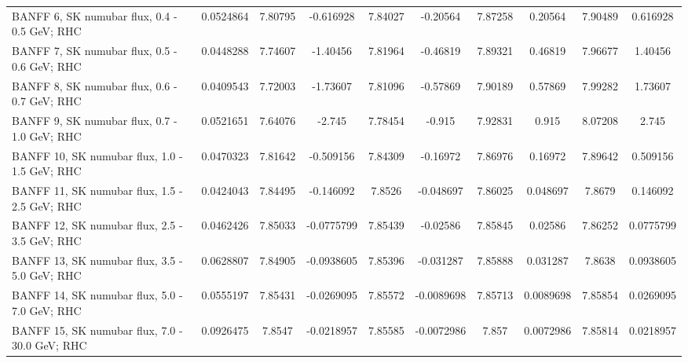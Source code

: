 \begin{tabular}{| l | S | S  S | S  S | S  S | S  S | }
                                   BANFF  6, SK numubar flux, 0.4 - 0.5 GeV; RHC &       0.0524864 &         7.80795 &       -0.616928 &         7.84027 &        -0.20564 &         7.87258 &         0.20564 &         7.90489 &        0.616928 \\ 
                                   BANFF  7, SK numubar flux, 0.5 - 0.6 GeV; RHC &       0.0448288 &         7.74607 &        -1.40456 &         7.81964 &        -0.46819 &         7.89321 &         0.46819 &         7.96677 &         1.40456 \\ 
                                   BANFF  8, SK numubar flux, 0.6 - 0.7 GeV; RHC &       0.0409543 &         7.72003 &        -1.73607 &         7.81096 &        -0.57869 &         7.90189 &         0.57869 &         7.99282 &         1.73607 \\ 
                                   BANFF  9, SK numubar flux, 0.7 - 1.0 GeV; RHC &       0.0521651 &         7.64076 &          -2.745 &         7.78454 &          -0.915 &         7.92831 &           0.915 &         8.07208 &           2.745 \\ 
                                   BANFF 10, SK numubar flux, 1.0 - 1.5 GeV; RHC &       0.0470323 &         7.81642 &       -0.509156 &         7.84309 &        -0.16972 &         7.86976 &         0.16972 &         7.89642 &        0.509156 \\ 
                                   BANFF 11, SK numubar flux, 1.5 - 2.5 GeV; RHC &       0.0424043 &         7.84495 &       -0.146092 &          7.8526 &       -0.048697 &         7.86025 &        0.048697 &          7.8679 &        0.146092 \\ 
                                   BANFF 12, SK numubar flux, 2.5 - 3.5 GeV; RHC &       0.0462426 &         7.85033 &      -0.0775799 &         7.85439 &        -0.02586 &         7.85845 &         0.02586 &         7.86252 &       0.0775799 \\ 
                                   BANFF 13, SK numubar flux, 3.5 - 5.0 GeV; RHC &       0.0628807 &         7.84905 &      -0.0938605 &         7.85396 &       -0.031287 &         7.85888 &        0.031287 &          7.8638 &       0.0938605 \\ 
                                   BANFF 14, SK numubar flux, 5.0 - 7.0 GeV; RHC &       0.0555197 &         7.85431 &      -0.0269095 &         7.85572 &      -0.0089698 &         7.85713 &       0.0089698 &         7.85854 &       0.0269095 \\ 
                                  BANFF 15, SK numubar flux, 7.0 - 30.0 GeV; RHC &       0.0926475 &          7.8547 &      -0.0218957 &         7.85585 &      -0.0072986 &           7.857 &       0.0072986 &         7.85814 &       0.0218957 \\ 

\end{tabular}
